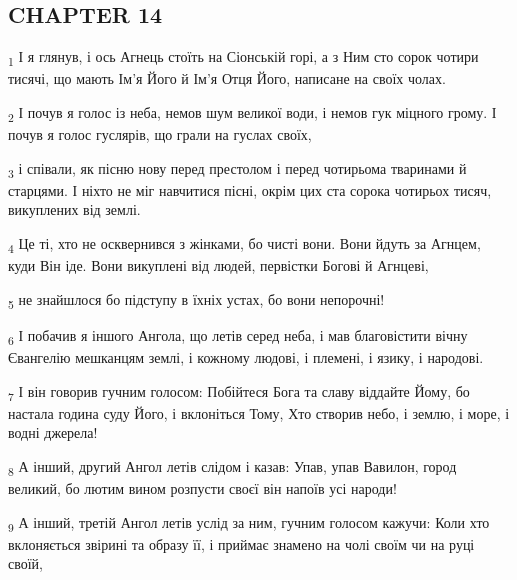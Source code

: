 \subsection{CHAPTER 14}
\begin{tcolorbox}
\textsubscript{1} І я глянув, і ось Агнець стоїть на Сіонській горі, а з Ним сто сорок чотири тисячі, що мають Ім'я Його й Ім'я Отця Його, написане на своїх чолах.
\end{tcolorbox}
\begin{tcolorbox}
\textsubscript{2} І почув я голос із неба, немов шум великої води, і немов гук міцного грому. І почув я голос гуслярів, що грали на гуслах своїх,
\end{tcolorbox}
\begin{tcolorbox}
\textsubscript{3} і співали, як пісню нову перед престолом і перед чотирьома тваринами й старцями. І ніхто не міг навчитися пісні, окрім цих ста сорока чотирьох тисяч, викуплених від землі.
\end{tcolorbox}
\begin{tcolorbox}
\textsubscript{4} Це ті, хто не осквернився з жінками, бо чисті вони. Вони йдуть за Агнцем, куди Він іде. Вони викуплені від людей, первістки Богові й Агнцеві,
\end{tcolorbox}
\begin{tcolorbox}
\textsubscript{5} не знайшлося бо підступу в їхніх устах, бо вони непорочні!
\end{tcolorbox}
\begin{tcolorbox}
\textsubscript{6} І побачив я іншого Ангола, що летів серед неба, і мав благовістити вічну Євангелію мешканцям землі, і кожному людові, і племені, і язику, і народові.
\end{tcolorbox}
\begin{tcolorbox}
\textsubscript{7} І він говорив гучним голосом: Побійтеся Бога та славу віддайте Йому, бо настала година суду Його, і вклоніться Тому, Хто створив небо, і землю, і море, і водні джерела!
\end{tcolorbox}
\begin{tcolorbox}
\textsubscript{8} А інший, другий Ангол летів слідом і казав: Упав, упав Вавилон, город великий, бо лютим вином розпусти своєї він напоїв усі народи!
\end{tcolorbox}
\begin{tcolorbox}
\textsubscript{9} А інший, третій Ангол летів услід за ним, гучним голосом кажучи: Коли хто вклоняється звірині та образу її, і приймає знамено на чолі своїм чи на руці своїй,
\end{tcolorbox}
